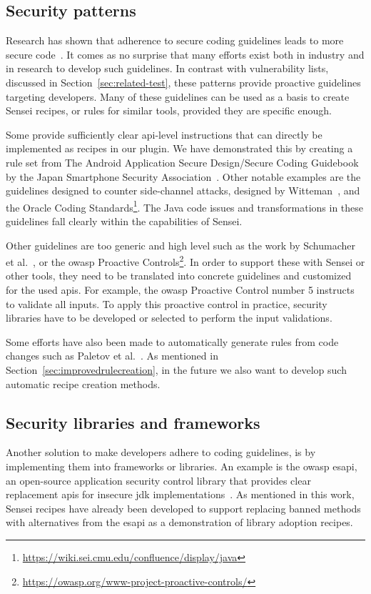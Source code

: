 \subsection{Security patterns}
Research has shown that adherence to secure coding guidelines leads to more secure code~\cite{lipfordimpact}.
It comes as no surprise that many efforts exist both in industry and in research to develop such guidelines.
In contrast with vulnerability lists, discussed in Section~\ref{sec:related-test}, these patterns provide proactive guidelines targeting developers.
Many of these guidelines can be used as a basis to create Sensei recipes, or rules for similar tools, provided they are specific enough.

Some provide sufficiently clear \gls{api}-level instructions that can directly be implemented as recipes in our plugin.
We have demonstrated this by creating a rule set from The Android Application Secure Design/Secure Coding Guidebook by the Japan Smartphone Security Association~\cite{jssec}.
Other notable examples are the guidelines designed to counter side-channel attacks, designed by Witteman~\cite{witteman2008secure}, and the Oracle Coding Standards\footnote{\url{https://wiki.sei.cmu.edu/confluence/display/java}}.
The Java code issues and transformations in these guidelines fall clearly within the capabilities of Sensei.

Other  guidelines are too generic and high level such as the work by Schumacher et al.~\cite{schumacher2013security}, or the \gls{owasp} Proactive Controls\footnote{\url{https://owasp.org/www-project-proactive-controls/}}.
In order to support these with Sensei or other tools, they need to be translated into concrete guidelines and customized for the used \glspl{api}.
For example, the \gls{owasp} Proactive Control number 5 instructs to validate all inputs.
To apply this proactive control in practice, security libraries have to be developed or selected to perform the input validations.

Some efforts have also been made to automatically generate rules from code changes such as Paletov et al.~\cite{paletov2018inferring}.
As mentioned in Section~\ref{sec:improvedrulecreation}, in the future we also want to develop such automatic recipe creation methods.

\subsection{Security libraries and frameworks}
Another solution to make developers adhere to coding guidelines, is by implementing them into frameworks or libraries.
An example is the \gls{owasp} \gls{esapi}, an open-source application security control library that provides clear replacement \glspl{api} for insecure \gls{jdk} implementations~\cite{ESAPI}.
As mentioned in this work, Sensei recipes have already been developed to support replacing banned methods with alternatives from the \gls{esapi} as a demonstration of library adoption recipes. 

